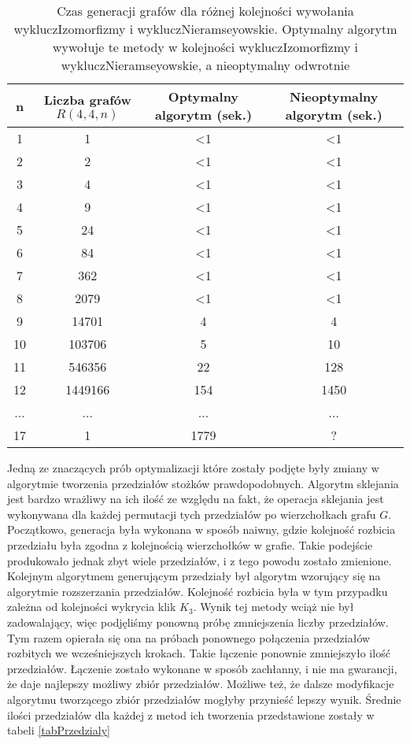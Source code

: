 \begin{table}[H]
 \begin{center}
 \begin{tabular}{|c c c c|} 
 \hline
 n & Liczba grafów $R(4,4,n)$ & Optymalny algorytm (sek.) & Nieoptymalny algorytm (sek.) \\ 
 \hline\hline
 1 & 1 & <1 & <1\\ 
 \hline
 2 & 2 & <1 & <1\\
 \hline
 3 & 4 & <1 & <1\\
 \hline
 4 & 9 & <1 & <1\\
 \hline
 5 & 24 & <1 & <1\\
 \hline
 6 & 84 & <1 & <1\\
 \hline
 7 & 362 & <1 & <1\\
 \hline
 8 & 2079 & <1 & <1\\
 \hline
 9 & 14701 & 4 & 4\\
 \hline
 10 & 103706 & 5 & 10\\
 \hline
 11 & 546356 & 22 & 128\\
 \hline
 12 & 1449166 & 154 & 1450\\
 \hline
 ... & ... & ... & ...\\
 \hline
  17 & 1 & 1779 & ?\\
 \hline
\end{tabular}
\end{center}
 \caption{Czas generacji grafów dla różnej kolejności wywołania wykluczIzomorfizmy i wykluczNieramseyowskie. Optymalny algorytm wywołuje te metody w kolejności wykluczIzomorfizmy i wykluczNieramseyowskie, a nieoptymalny odwrotnie}
 \label{czasgen}
 \end{table}

Jedną ze znaczących prób optymalizacji które zostały podjęte były zmiany w algorytmie tworzenia przedziałów stożków prawdopodobnych. Algorytm sklejania jest bardzo wrażliwy na ich ilość ze względu na fakt, że operacja sklejania jest wykonywana dla każdej permutacji tych przedziałów po wierzchołkach grafu $G$. Początkowo, generacja była wykonana w sposób naiwny, gdzie kolejność rozbicia przedziału była zgodna z kolejnością wierzchołków w grafie. Takie podejście produkowało jednak zbyt wiele przedziałów, i z tego powodu zostało zmienione. Kolejnym algorytmem generującym przedziały był algorytm wzorujący się na algorytmie rozszerzania przedziałów. Kolejność rozbicia była w tym przypadku zależna od kolejności wykrycia klik $K_3$. Wynik tej metody wciąż nie był zadowalający, więc podjęliśmy ponowną próbę zmniejszenia liczby przedziałów. Tym razem opierała się ona na próbach ponownego połączenia przedziałów rozbitych we wcześniejszych krokach. Takie łączenie ponownie zmniejszyło ilość przedziałów. Łączenie zostało wykonane w sposób zachłanny, i nie ma gwarancji, że daje najlepszy możliwy zbiór przedziałów. Możliwe też, że dalsze modyfikacje algorytmu tworzącego zbiór przedziałów mogłyby przynieść lepszy wynik. Średnie ilości przedziałów dla każdej z metod ich tworzenia przedstawione zostały w tabeli \ref{tabPrzedzialy}

